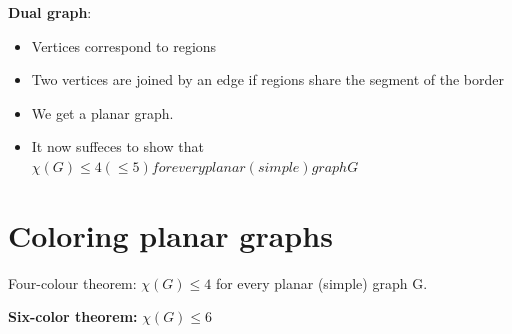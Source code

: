 \documentclass[9pt, letterpaper, oneside]{article}
\begin{document}
\textbf{Dual graph}:
\begin{itemize}
    \item Vertices correspond to regions
    \item Two vertices are joined by an edge if regions share the segment of the border
    \item We get a planar graph.
    \item It now suffeces to show that $\chi(G) \leq 4 (\leq 5) for every planar (simple) graph G$
\end{itemize}



\section{Coloring planar graphs}

Four-colour theorem: $\chi(G) \leq 4$ for every planar (simple) graph G.

\textbf{Six-color theorem:} $\chi(G) \leq 6$
\end{document}
